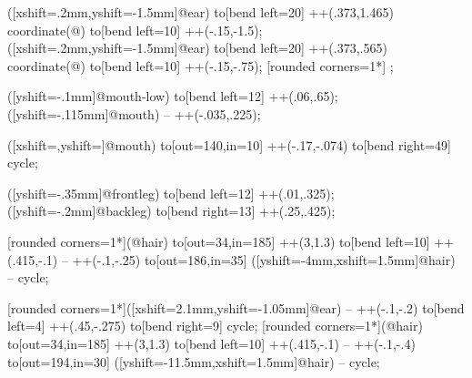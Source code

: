 {%
\if@pingu@@horse@@donkey@
{} ([xshift=.2mm,yshift=-1.5mm]@ear) to[bend left=20] ++(.373,1.465) coordinate(@) to[bend left=10] ++(-.15,-1.5);
\else
{} ([xshift=.2mm,yshift=-1.5mm]@ear) to[bend left=20] ++(.373,.565) coordinate(@) to[bend left=10] ++(-.15,-.75);
\fi
 [rounded corners=1*\pingu@@horse@scale] \pingu@@horse@@main;

 ([yshift=-.1mm]@mouth-low) to[bend left=12] ++(.06,.65);
 ([yshift=-.115mm]@mouth) -- ++(-.035,.225);

 ([xshift=\if@pingu@@horse@@donkey@ 4.5mm\fi,yshift=\if@pingu@@horse@@donkey@3.65mm\fi]@mouth) to[out=140,in=10] ++(-.17,-.074) to[bend right=49] cycle;

 ([yshift=-.35mm]@frontleg) to[bend left=12] ++(.01,.325);
 ([yshift=-.2mm]@backleg) to[bend right=13] ++(.25,.425);

\if@pingu@@horse@@donkey@
{} [rounded corners=1*\pingu@@horse@scale](@hair) to[out=34,in=185] ++(3,1.3) to[bend left=10] ++(.415,-.1) -- ++(-.1,-.25) to[out=186,in=35] ([yshift=-4mm,xshift=1.5mm]@hair) -- cycle;

 [rounded corners=1*\pingu@@horse@scale]([xshift=2.1mm,yshift=-1.05mm]@ear) -- ++(-.1,-.2) to[bend left=4] ++(.45,-.275) to[bend right=9] cycle;
\else
{} [rounded corners=1*\pingu@@horse@scale](@hair) to[out=34,in=185] ++(3,1.3) to[bend left=10] ++(.415,-.1) -- ++(-.1,-.4) to[out=194,in=30] ([yshift=-11.5mm,xshift=1.5mm]@hair) -- cycle;

}
